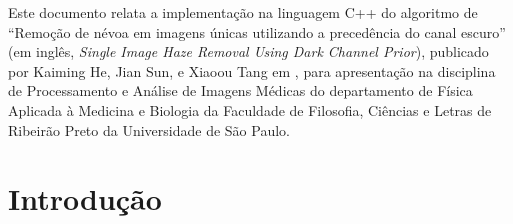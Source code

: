 \documentclass[12pt,openany, oneside,
 article, 
 a4paper, hyphens, english, brazil]{abntex2}
\begin{document}
	\frenchspacing 

\imprimirfolhaderosto
		\newpage
		
		
	\setcounter{page}{1}
	
	\textual
	\pagestyle{plain}
	
\begin{resumo}
	Este documento relata a implementação na linguagem C++ do algoritmo de ``Remoção de névoa em imagens únicas utilizando a precedência do canal escuro'' (em inglês, \textit{Single Image Haze Removal Using Dark Channel Prior}), publicado por Kaiming He, Jian Sun, e Xiaoou Tang em \cite{HazeRemoval}, para apresentação na disciplina de Processamento e Análise de Imagens Médicas do departamento de Física Aplicada à Medicina e Biologia da Faculdade de Filosofia, Ciências e Letras de Ribeirão Preto da Universidade de São Paulo.
	
\end{resumo}	
	
\section{Introdução}
\setlength{\ABNTEXcitacaorecuo}{0.9cm}
\end{document}
